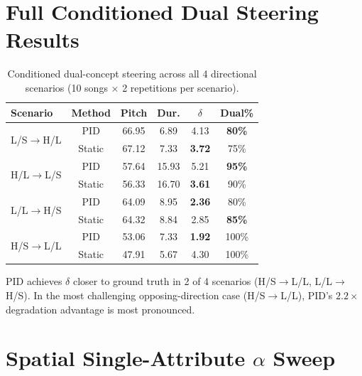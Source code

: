 \documentclass{article}
\theoremstyle{plain}
\begin{document}
\section{Full Conditioned Dual Steering Results}
\label{app:conditioned_dual}

\begin{table}[h]
  \caption{Conditioned dual-concept steering across all 4 directional scenarios (10 songs $\times$ 2 repetitions per scenario).}
  \label{tab:conditioned_full}
  \begin{center}
  \begin{small}
  \begin{tabular}{lccccc}
    \toprule
    Scenario & Method & Pitch & Dur. & $\delta$ & Dual\% \\
    \midrule
    \multirow{2}{*}{L/S$\to$H/L} & PID & 66.95 & 6.89 & 4.13 & \textbf{80\%} \\
    & Static & 67.12 & 7.33 & \textbf{3.72} & 75\% \\
    \midrule
    \multirow{2}{*}{H/L$\to$L/S} & PID & 57.64 & 15.93 & 5.21 & \textbf{95\%} \\
    & Static & 56.33 & 16.70 & \textbf{3.61} & 90\% \\
    \midrule
    \multirow{2}{*}{L/L$\to$H/S} & PID & 64.09 & 8.95 & \textbf{2.36} & 80\% \\
    & Static & 64.32 & 8.84 & 2.85 & \textbf{85\%} \\
    \midrule
    \multirow{2}{*}{H/S$\to$L/L} & PID & 53.06 & 7.33 & \textbf{1.92} & 100\% \\
    & Static & 47.91 & 5.67 & 4.30 & 100\% \\
    \bottomrule
  \end{tabular}
  \end{small}
  \end{center}
\end{table}

PID achieves $\delta$ closer to ground truth in 2 of 4 scenarios (H/S$\to$L/L, L/L$\to$H/S). In the most challenging opposing-direction case (H/S$\to$L/L), PID's $2.2{\times}$ degradation advantage is most pronounced.

\section{Spatial Single-Attribute $\alpha$ Sweep}
\label{app:alpha_sweep}
\end{document}
